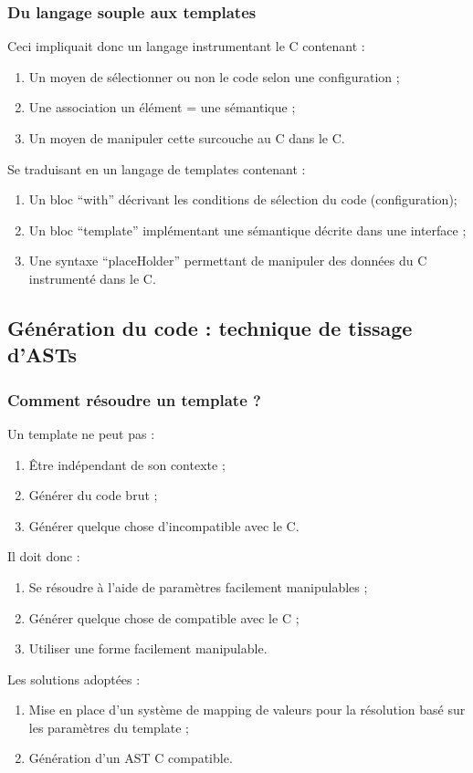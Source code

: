 \documentclass[]{beamer}
\begin{document}
\begin{frame}
\frametitle{Du langage souple aux templates}
 {
    Ceci impliquait donc un langage instrumentant le C contenant :
    \begin{enumerate}[<+->]
        \item Un moyen de sélectionner ou non le code selon
            une configuration ;
        \item Une association un élément = une sémantique ;
        \item Un moyen de manipuler cette surcouche au C dans le C.
    \end{enumerate}
}
 {
    Se traduisant en un langage de templates contenant :
    \begin{enumerate}
        \item Un bloc ``with'' décrivant les conditions de sélection
            du code (configuration);
        \item Un bloc ``template'' implémentant une sémantique décrite dans
            une interface ;
        \item Une syntaxe ``placeHolder'' permettant de manipuler
            des données du C instrumenté dans le C.
    \end{enumerate}
}
\end{frame}


\subsection{Génération du code : technique de tissage d'ASTs}
\begin{frame}
\frametitle{Comment résoudre un template ?}
 {
    Un template ne peut pas :
    \begin{enumerate}[<+->]
        \item Être indépendant de son contexte ;
        \item Générer du code brut ;
        \item Générer quelque chose d'incompatible avec le C.
    \end{enumerate}
     {
        Il doit donc :
        \begin{enumerate}[<+->]
            \item Se résoudre à l'aide de paramètres facilement manipulables ;
            \item Générer quelque chose de compatible avec le C ;
            \item Utiliser une forme facilement manipulable.
        \end{enumerate}
    }
}
 {
    Les solutions adoptées :
    \begin{enumerate}
        \item Mise en place d'un système de mapping de valeurs pour
            la résolution basé sur les paramètres du template ;
        \item Génération d'un AST C compatible.
    \end{enumerate}
}
\end{frame}
\end{document}
